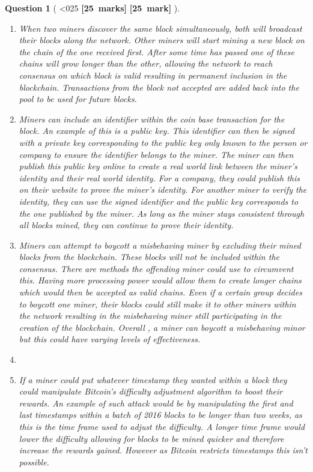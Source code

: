 \documentclass[a4paper]{article}
\theoremstyle{que}
\newtheorem{question}{Question}
\newcommand{\fixoffset}{\mbox{}\vspace*{-\bigskipamount}\vspace*{-\medskipamount}}
\newcommand\points[1]{%
\ifnum1<0#1\relax%
    {\bf \small [#1~marks]}%
  \else%
    {\bf \small [#1~mark]}%
  \fi%
}%
\begin{document}
\begin{question}[\points{25}]
  \fixoffset
  \begin{enumerate}[label=(\alph*)]
    \item When two miners discover the same block simultaneously, both will broadcast their blocks along the network. Other miners will start mining a new block on the chain of the one received first. After some time has passed one of these chains will grow longer than the other, allowing the network to reach consensus on which block is valid resulting in permanent inclusion in the blockchain. Transactions from the block not accepted are added back into the pool to be used for future blocks. \cite{nakamoto2008bitcoin}
    
    \item Miners can include an identifier within the coin base transaction for the block. An example of this is a public key. This identifier can then be signed with a private key corresponding to the public key only known to the person or company to ensure the identifier belongs to the miner. The miner can then publish this public key online to create a real world link between the miner's identity and their real world identity. For a company, they could publish this on their website to prove the miner's identity. For another miner to verify the identity, they can use the signed identifier and the public key corresponds to the one published by the miner. As long as the miner stays consistent through all blocks mined, they can continue to prove their identity.
    
    \item Miners can attempt to boycott a misbehaving miner by excluding their mined blocks from the blockchain. These blocks will not be included within the consensus. There are methods the offending miner could use to circumvent this. Having more processing power would allow them to create longer chains which would then be accepted as valid chains. Even if a certain group decides to boycott one miner, their blocks could still make it to other miners within the network resulting in the misbehaving miner still participating in the creation of the blockchain. Overall , a miner can boycott a misbehaving minor but this could have varying levels of effectiveness.
    
    \item 
    \item[(i)] If a miner could put whatever timestamp they wanted within a block they could manipulate Bitcoin's difficulty adjustment algorithm to boost their rewards. An example of such attack would be by manipulating the first and last timestamps within a batch of 2016 blocks to be longer than two weeks, as this is the time frame used to adjust the difficulty. A longer time frame would lower the difficulty allowing for blocks to be mined quicker and therefore increase the rewards gained. However as Bitcoin restricts timestamps this isn't possible.
    

\end{enumerate}
\end{question}
\end{document}
